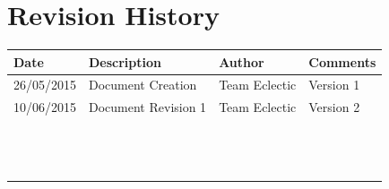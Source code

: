 \documentclass[11pt]{article}
\begin{document}


\setcounter{tocdepth}{3}
\setcounter{secnumdepth}{5}
\tableofcontents

\newpage
\section{Revision History}
\begin{table}[h]
\begin{tabular}{llll}
\textbf{Date}          & \textbf{Description}  & \textbf{Author}       & \textbf{Comments}   \\ \hline
\multicolumn{1}{|R{2cm}|}{26/05/2015} & \multicolumn{1}{L{4.5cm}|}{Document Creation} & \multicolumn{1}{l|}{Team Eclectic} & \multicolumn{1}{L{4cm}|}{Version 1} \\ \hline
\multicolumn{1}{|l|}{10/06/2015} & \multicolumn{1}{l|}{Document Revision 1} & \multicolumn{1}{l|}{Team Eclectic} & \multicolumn{1}{l|}{Version 2} \\ \hline
\multicolumn{1}{|l|}{} & \multicolumn{1}{l|}{} & \multicolumn{1}{l|}{} & \multicolumn{1}{l|}{} \\ \hline
\multicolumn{1}{|l|}{} & \multicolumn{1}{l|}{} & \multicolumn{1}{l|}{} & \multicolumn{1}{l|}{} \\ \hline
\multicolumn{1}{|l|}{} & \multicolumn{1}{l|}{} & \multicolumn{1}{l|}{} & \multicolumn{1}{l|}{} \\ \hline
\multicolumn{1}{|l|}{} & \multicolumn{1}{l|}{} & \multicolumn{1}{l|}{} & \multicolumn{1}{l|}{} \\ \hline
\multicolumn{1}{|l|}{} & \multicolumn{1}{l|}{} & \multicolumn{1}{l|}{} & \multicolumn{1}{l|}{} \\ \hline
\multicolumn{1}{|l|}{} & \multicolumn{1}{l|}{} & \multicolumn{1}{l|}{} & \multicolumn{1}{l|}{} \\ \hline
\multicolumn{1}{|l|}{} & \multicolumn{1}{l|}{} & \multicolumn{1}{l|}{} & \multicolumn{1}{l|}{} \\ \hline
\multicolumn{1}{|l|}{} & \multicolumn{1}{l|}{} & \multicolumn{1}{l|}{} & \multicolumn{1}{l|}{} \\ \hline
\multicolumn{1}{|l|}{} & \multicolumn{1}{l|}{} & \multicolumn{1}{l|}{} & \multicolumn{1}{l|}{} \\ \hline
\multicolumn{1}{|l|}{} & \multicolumn{1}{l|}{} & \multicolumn{1}{l|}{} & \multicolumn{1}{l|}{} \\ \hline
\multicolumn{1}{|l|}{} & \multicolumn{1}{l|}{} & \multicolumn{1}{l|}{} & \multicolumn{1}{l|}{} \\ \hline
\multicolumn{1}{|l|}{} & \multicolumn{1}{l|}{} & \multicolumn{1}{l|}{} & \multicolumn{1}{l|}{} \\ \hline
\multicolumn{1}{|l|}{} & \multicolumn{1}{l|}{} & \multicolumn{1}{l|}{} & \multicolumn{1}{l|}{} \\ \hline
\end{tabular}
\end{table}
\end{document}
